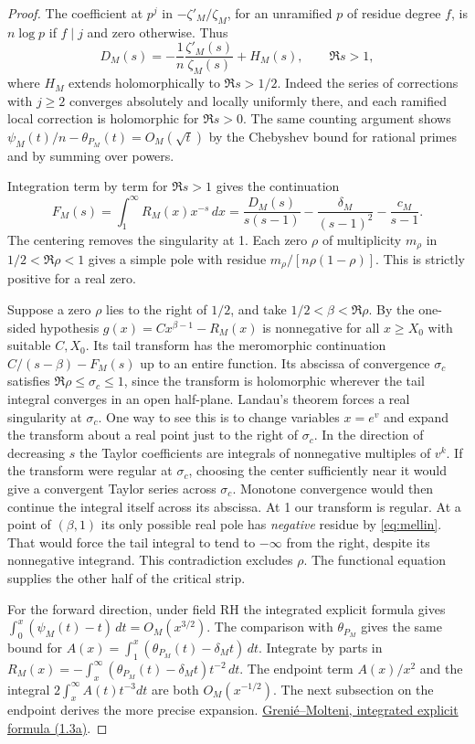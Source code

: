 \documentclass[11pt]{article}
\begin{document}
\begin{proof}
The coefficient at $p^j$ in $-\zeta'_M/\zeta_M$, for an unramified $p$ of residue degree $f$, is $n\log p$ if $f\mid j$ and zero otherwise. Thus
\[
 D_M(s)=-\frac1n\frac{\zeta'_M(s)}{\zeta_M(s)}+H_M(s),
 \qquad \Re s>1,
\]
where $H_M$ extends holomorphically to $\Re s>1/2$. Indeed the series of corrections with $j\ge2$ converges absolutely and locally uniformly there, and each ramified local correction is holomorphic for $\Re s>0$. The same counting argument shows $\psi_M(t)/n-\theta_{P_M}(t)=O_M(\sqrt t)$ by the Chebyshev bound for rational primes and by summing over powers.

Integration term by term for $\Re s>1$ gives the continuation
\begin{equation}\label{eq:mellin}
 F_M(s)=\int_1^\infty R_M(x)x^{-s}\,dx
       =\frac{D_M(s)}{s(s-1)}-
           \frac{\delta_M}{(s-1)^2}-\frac{c_M}{s-1}.
\end{equation}
The centering removes the singularity at 1. Each zero $\rho$ of multiplicity $m_\rho$ in $1/2<\Re\rho<1$ gives a simple pole with residue
$m_\rho/[n\rho(1-\rho)]$. This is strictly positive for a real zero.

Suppose a zero $\rho$ lies to the right of $1/2$, and take $1/2<\beta<\Re\rho$. By the one-sided hypothesis $g(x)=C x^{\beta-1}-R_M(x)$ is nonnegative for all $x\ge X_0$ with suitable $C,X_0$. Its tail transform has the meromorphic continuation $C/(s-\beta)-F_M(s)$ up to an entire function. Its abscissa of convergence $\sigma_c$ satisfies $\Re\rho\le\sigma_c\le1$, since the transform is holomorphic wherever the tail integral converges in an open half-plane. Landau's theorem forces a real singularity at $\sigma_c$. One way to see this is to change variables $x=e^v$ and expand the transform about a real point just to the right of $\sigma_c$. In the direction of decreasing $s$ the Taylor coefficients are integrals of nonnegative multiples of $v^k$. If the transform were regular at $\sigma_c$, choosing the center sufficiently near it would give a convergent Taylor series across $\sigma_c$. Monotone convergence would then continue the integral itself across its abscissa. At 1 our transform is regular. At a point of $(\beta,1)$ its only possible real pole has \emph{negative} residue by \eqref{eq:mellin}. That would force the tail integral to tend to $-\infty$ from the right, despite its nonnegative integrand. This contradiction excludes $\rho$. The functional equation supplies the other half of the critical strip.

For the forward direction, under field RH the integrated explicit formula gives
$\int_0^x(\psi_M(t)-t)\,dt=O_M(x^{3/2})$.
The comparison with $\theta_{P_M}$ gives the same bound for $A(x)=\int_1^x(\theta_{P_M}(t)-\delta_Mt)\,dt$. Integrate by parts in
$R_M(x)=-\int_x^\infty(\theta_{P_M}(t)-\delta_M t)t^{-2}\,dt$.
The endpoint term $A(x)/x^2$ and the integral $2\int_x^\infty A(t)t^{-3}dt$ are both $O_M(x^{-1/2})$. The next subsection on the endpoint derives the more precise expansion. \href{https://arxiv.org/pdf/1312.4465}{Grenié--Molteni, integrated explicit formula (1.3a)}.
\end{proof}
\end{document}
